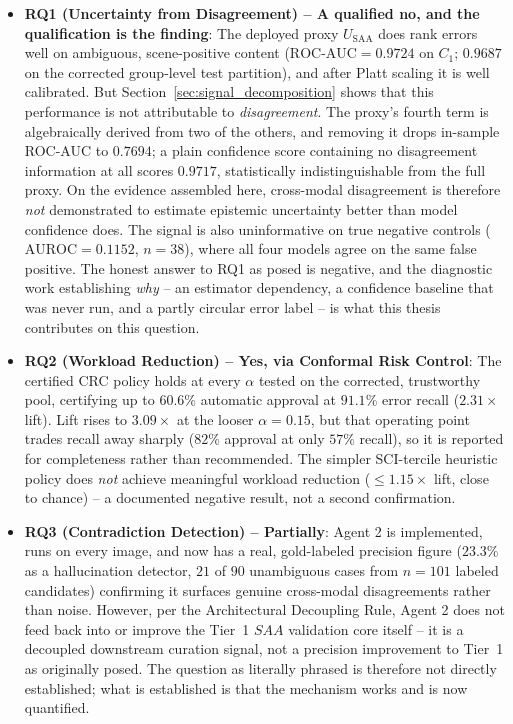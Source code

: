 \documentclass[12pt,a4paper]{report}
\begin{document}
\begin{itemize}
    \item \textbf{RQ1 (Uncertainty from Disagreement) -- A qualified no, and the qualification is the finding}: The deployed proxy $U_{\text{SAA}}$ does rank errors well on ambiguous, scene-positive content ($\text{ROC-AUC}=0.9724$ on $C_1$; $0.9687$ on the corrected group-level test partition), and after Platt scaling it is well calibrated. But Section~\ref{sec:signal_decomposition} shows that this performance is not attributable to \emph{disagreement}. The proxy's fourth term is algebraically derived from two of the others, and removing it drops in-sample ROC-AUC to $0.7694$; a plain confidence score containing no disagreement information at all scores $0.9717$, statistically indistinguishable from the full proxy. On the evidence assembled here, cross-modal disagreement is therefore \emph{not} demonstrated to estimate epistemic uncertainty better than model confidence does. The signal is also uninformative on true negative controls ($\text{AUROC}=0.1152$, $n=38$), where all four models agree on the same false positive. The honest answer to RQ1 as posed is negative, and the diagnostic work establishing \emph{why} -- an estimator dependency, a confidence baseline that was never run, and a partly circular error label -- is what this thesis contributes on this question.
    \item \textbf{RQ2 (Workload Reduction) -- Yes, via Conformal Risk Control}: The certified CRC policy holds at every $\alpha$ tested on the corrected, trustworthy pool, certifying up to $60.6\%$ automatic approval at $91.1\%$ error recall ($2.31\times$ lift). Lift rises to $3.09\times$ at the looser $\alpha=0.15$, but that operating point trades recall away sharply ($82\%$ approval at only $57\%$ recall), so it is reported for completeness rather than recommended. The simpler SCI-tercile heuristic policy does \emph{not} achieve meaningful workload reduction ($\le 1.15\times$ lift, close to chance) -- a documented negative result, not a second confirmation.
    \item \textbf{RQ3 (Contradiction Detection) -- Partially}: Agent 2 is implemented, runs on every image, and now has a real, gold-labeled precision figure ($23.3\%$ as a hallucination detector, $21$ of $90$ unambiguous cases from $n=101$ labeled candidates) confirming it surfaces genuine cross-modal disagreements rather than noise. However, per the Architectural Decoupling Rule, Agent 2 does not feed back into or improve the Tier~1 $SAA$ validation core itself -- it is a decoupled downstream curation signal, not a precision improvement to Tier~1 as originally posed. The question as literally phrased is therefore not directly established; what is established is that the mechanism works and is now quantified.

\end{itemize}
\end{document}
